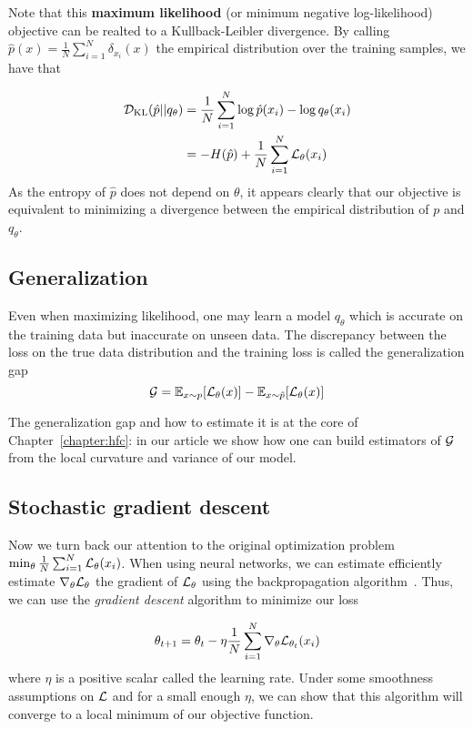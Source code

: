 Note that this \textbf{maximum likelihood} (or minimum negative log-likelihood) objective can be realted  to a Kullback-Leibler divergence. By calling $\hat{p}(x) = \frac{1}{N} \sum_{i=1}^N \delta_{x_i}(x)$ the empirical distribution over the training samples, we have that

\begin{align*}
{\mathcal{D}}_{\mathrm{KL}}(\hat{p}||q_\theta) &= \frac{1}{N} \sum_{i=1}^N \log \hat{p}(x_i) - \log q_\theta(x_i) \\
&= - H(\hat{p}) +  \frac{1}{N} \sum_{i=1}^N {\mathcal{L}}_\theta(x_i)\\
\end{align*}
As the entropy of $\hat{p}$ does not depend on $\theta$, it appears clearly that our objective is equivalent to minimizing a divergence between the empirical distribution of $p$ and $q_\theta$.

\subsection{Generalization}
Even when maximizing likelihood, one may learn a model $q_\theta$ which is accurate on the training data but inaccurate on unseen data. %
The discrepancy between the loss on the true data distribution and the training loss is called the generalization gap
$${\mathcal{G}} = \mathbb{E}_{x\sim p}[{\mathcal{L}}_\theta(x)] -\mathbb{E}_{x\sim \hat{p}}[{\mathcal{L}}_\theta(x)]$$


The generalization gap and how to estimate it is at the core of Chapter~\ref{chapter:hfc}: in our article we show how one can build estimators of ${\mathcal{G}}$ from the local curvature and variance of our model. 

\subsection{Stochastic gradient descent}
Now we turn back our attention to the original optimization problem $\min_\theta \frac{1}{N} \sum_{i=1}^N {\mathcal{L}}_\theta(x_i)$. When using neural networks, we can estimate efficiently estimate $\nabla_\theta {\mathcal{L}}_\theta$ the gradient of ${\mathcal{L}}_\theta$ using the backpropagation algorithm~\citep{rumelhart1986learning}. Thus, we can use the \emph{gradient descent} algorithm to minimize our loss

\begin{equation}
\label{eq:gradient_descent}
    \theta_{t+1} = \theta_t - \eta \frac{1}{N} \sum_{i=1}^N \nabla_\theta {\mathcal{L}}_{\theta_t}(x_i)
\end{equation}
where $\eta$ is a positive scalar called the learning rate. Under some smoothness assumptions on ${\mathcal{L}}$ and for a small enough $\eta$, we can show that this algorithm will converge to a local minimum of our objective function.

